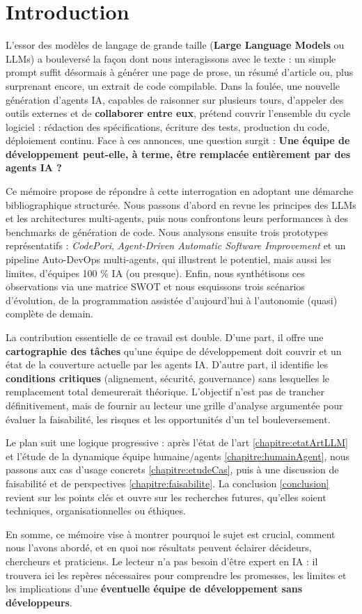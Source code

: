 \chapter{Introduction}

L’essor des modèles de langage de grande taille (\textbf{Large Language Models} ou LLMs) a bouleversé la façon dont nous interagissons avec le texte : un simple prompt suffit désormais à générer une page de prose, un résumé d’article ou, plus surprenant encore, un extrait de code compilable.  Dans la foulée, une nouvelle génération d’agents IA, capables de raisonner sur plusieurs tours, d’appeler des outils externes et de \textbf{collaborer entre eux}, prétend couvrir l’ensemble du cycle logiciel : rédaction des spécifications, écriture des tests, production du code, déploiement continu.  Face à ces annonces, une question surgit : \textbf{Une équipe de développement peut-elle, à terme, être remplacée entièrement par des agents IA ?}

Ce mémoire propose de répondre à cette interrogation en adoptant une démarche bibliographique structurée.  Nous passons d’abord en revue les principes des LLMs et les architectures multi-agents, puis nous confrontons leurs performances à des benchmarks de génération de code.  Nous analysons ensuite trois prototypes représentatifs : \textit{CodePori}, \textit{Agent-Driven Automatic Software Improvement} et un pipeline Auto-DevOps multi-agents, qui illustrent le potentiel, mais aussi les limites, d’équipes 100 \% IA (ou presque). Enfin, nous synthétisons ces observations via une matrice SWOT et nous esquissons trois scénarios d’évolution, de la programmation assistée d’aujourd’hui à l’autonomie (quasi) complète de demain.

La contribution essentielle de ce travail est double.  D’une part, il offre une \textbf{cartographie des tâches} qu’une équipe de développement doit couvrir et un état de la couverture actuelle par les agents IA.  D’autre part, il identifie les \textbf{conditions critiques} (alignement, sécurité, gouvernance) sans lesquelles le remplacement total demeurerait théorique.  L’objectif n’est pas de trancher définitivement, mais de fournir au lecteur une grille d’analyse argumentée pour évaluer la faisabilité, les risques et les opportunités d’un tel bouleversement.

Le plan suit une logique progressive : après l’état de l’art \ref{chapitre:etatArtLLM} et l’étude de la dynamique équipe humaine/agents \ref{chapitre:humainAgent}, nous passons aux cas d’usage concrets \ref{chapitre:etudeCas}, puis à une discussion de faisabilité et de perspectives \ref{chapitre:faisabilite}.  La conclusion \ref{conclusion} revient sur les points clés et ouvre sur les recherches futures, qu’elles soient techniques, organisationnelles ou éthiques.

En somme, ce mémoire vise à montrer pourquoi le sujet est crucial, comment nous l’avons abordé, et en quoi nos résultats peuvent éclairer décideurs, chercheurs et praticiens.  Le lecteur n’a pas besoin d’être expert en IA : il trouvera ici les repères nécessaires pour comprendre les promesses, les limites et les implications d’une \textbf{éventuelle équipe de développement sans développeurs}.
